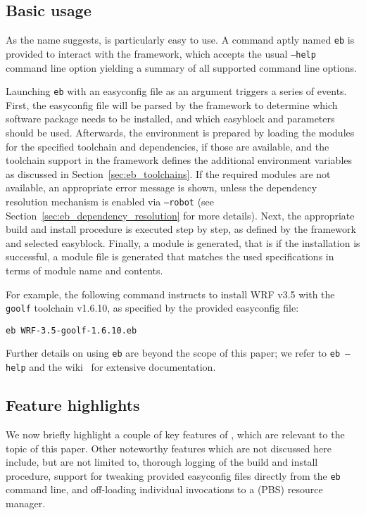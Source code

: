 \subsection{Basic usage}

As the name suggests, \easybuild{} is particularly easy to use. A command aptly named
\texttt{eb} is provided to interact with the \easybuild{} framework, which accepts
the usual \texttt{--help} command line option yielding a summary of all supported
command line options.

Launching \texttt{eb} with an easyconfig file as an argument triggers a
series of events. First, the easyconfig file will be parsed by the \easybuild{}
framework to determine which software package needs to be installed, and which
easyblock and parameters should be used. Afterwards, the environment is prepared by
loading the modules for the specified toolchain and dependencies, if those are
available, and the toolchain support in the framework defines the additional
environment variables as discussed in Section~\ref{sec:eb_toolchains}. If the
required modules are not available, an appropriate error message is shown, unless
the dependency resolution mechanism is enabled via \texttt{--robot} (see
Section~\ref{sec:eb_dependency_resolution} for more details). Next,
the appropriate build and install procedure is executed step by step, as defined by
the framework and selected easyblock. Finally, a module is generated, that is if the
installation is successful, a module file is generated that matches the used
specifications in terms of module name and contents.

For example, the following command instructs \easybuild{} to install WRF v3.5
with the \texttt{goolf} toolchain v1.6.10, as specified by the provided easyconfig
file:

\texttt{eb WRF-3.5-goolf-1.6.10.eb}

Further details on using \texttt{eb} are beyond the scope of this paper; we refer
to \texttt{eb --help} and the \easybuild{} wiki~\cite{ebwiki} for extensive
documentation.

\subsection{Feature highlights}

We now briefly highlight a couple of key features of \easybuild{}, which are relevant
to the topic of this paper. Other noteworthy features which are not discussed here
include, but are not limited to, thorough logging of the build and install procedure,
support for tweaking provided easyconfig files directly from the \texttt{eb} command
line, and off-loading individual \easybuild{} invocations to a (PBS) resource manager.

